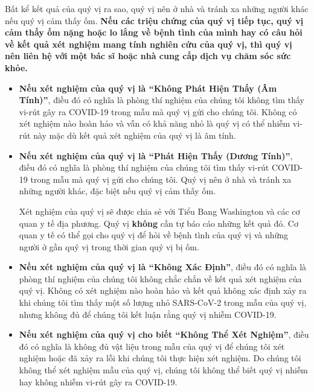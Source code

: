 \documentclass[10pt]{article}
\begin{document}
Bất kể kết quả của quý vị ra sao, quý vị nên ở nhà và tránh xa những người khác
nếu quý vị cảm thấy ốm. \textbf{Nếu các triệu chứng của quý vị tiếp tục, quý vị
cảm thấy ốm nặng hoặc lo lắng về bệnh tình của mình hay có câu hỏi về kết quả
xét nghiệm mang tính nghiên cứu của quý vị, thì quý vị nên liên hệ với một bác
sĩ hoặc nhà cung cấp dịch vụ chăm sóc sức khỏe.}

\begin{itemize}


\item

  \textbf{Nếu xét nghiệm của quý vị là ``Không Phát Hiện Thấy (Âm Tính)''}, điều
  đó có nghĩa là phòng thí nghiệm của chúng tôi không tìm thấy vi-rút gây ra
  COVID-19 trong mẫu mà quý vị gửi cho chúng tôi. Không có xét nghiệm nào hoàn
  hảo và vẫn có khả năng nhỏ là quý vị có thể nhiễm vi-rút này mặc dù kết quả
  xét nghiệm của quý vị là âm tính.

\item

  \textbf{Nếu xét nghiệm của quý vị là ``Phát Hiện Thấy (Dương Tính)''}, điều đó
  có nghĩa là phòng thí nghiệm của chúng tôi tìm thấy vi-rút COVID-19 trong mẫu
  mà quý vị gửi cho chúng tôi. Quý vị nên ở nhà và tránh xa những người khác,
  đặc biệt nếu quý vị cảm thấy ốm.

  Xét nghiệm của quý vị sẽ được chia sẻ với Tiểu Bang Washington và các cơ quan
  y tế địa phương. Quý vị \textbf{không} cần tự báo cáo những kết quả đó. Cơ
  quan y tế có thể gọi cho quý vị để hỏi về bệnh tình của quý vị và những người
  ở gần quý vị trong thời gian quý vị bị ốm.

\item

  \textbf{Nếu xét nghiệm của quý vị là ``Không Xác Định''}, điều đó có nghĩa là
  phòng thí nghiệm của chúng tôi không chắc chắn về kết quả xét nghiệm của quý
  vị. Không có xét nghiệm nào hoàn hảo và kết quả không xác định xảy ra khi
  chúng tôi tìm thấy một số lượng nhỏ SARS-CoV-2 trong mẫu của quý vị, nhưng
  không đủ để chúng tôi kết luận rằng quý vị nhiễm COVID-19.

\item

  \textbf{Nếu xét nghiệm của quý vị cho biết ``Không Thể Xét Nghiệm''}, điều đó
  có nghĩa là không đủ vật liệu trong mẫu của quý vị để chúng tôi xét nghiệm
  hoặc đã xảy ra lỗi khi chúng tôi thực hiện xét nghiệm. Do chúng tôi không thể
  xét nghiệm mẫu của quý vị, chúng tôi không thể biết quý vị nhiễm hay không
  nhiễm vi-rút gây ra COVID-19.

\end{itemize}
\end{document}
